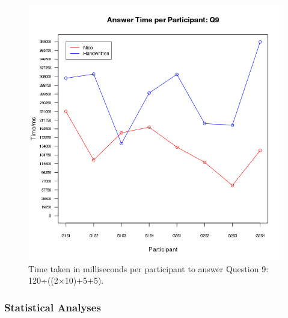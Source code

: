 \documentclass[12pt,twoside,notitlepage,xetex]{report}
\begin{document}
\begin{center}
\begin{figure}[H]
\begin{center}
\includegraphics[width=\textwidth-5cm]{figs/graphs/q9.png}
\end{center}
\caption{Time taken in milliseconds per participant to answer Question 9: 120÷((2×10)+5+5).}
\label{fig:PlotQ9}
\end{figure}
\end{center}

\subsubsection{Statistical Analyses}
\end{document}
